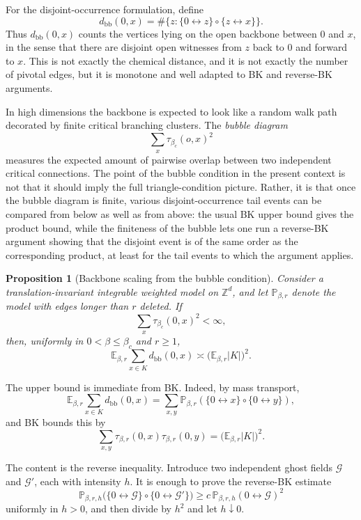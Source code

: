 \documentclass[11pt,reqno]{book}
\numberwithin{equation}{chapter}
\theoremstyle{plain}
\newtheorem{prop}[theorem]{Proposition}
\theoremstyle{definition}
\theoremstyle{remark}
\renewcommand{\P}{\mathbb P}
\newcommand{\E}{\mathbb E}
\newcommand{\1}{\mathbf 1}
\begin{document}
For the disjoint-occurrence formulation, define
\[
  d_{\mathrm{bb}}(0,x)
  =
  \#\{z:\{0\leftrightarrow z\}\circ\{z\leftrightarrow x\}\}.
\]
Thus \(d_{\mathrm{bb}}(0,x)\) counts the vertices lying on the open backbone
between \(0\) and \(x\), in the sense that there are disjoint open witnesses
from \(z\) back to \(0\) and forward to \(x\). This is not exactly the
chemical distance, and it is not exactly the number of pivotal edges, but it
is monotone and well adapted to BK and reverse-BK arguments.

In high dimensions the backbone is expected to look like a random walk path decorated by finite critical branching clusters. The \emph{bubble diagram}
\[
  \sum_x \tau_{\beta_c}(o,x)^2
\]
measures the expected amount of pairwise overlap between two independent critical connections. The point of the bubble condition in the present context is not that it should imply the full triangle-condition picture. Rather, it is that once the bubble diagram is finite, various disjoint-occurrence tail events can be compared from below as well as from above: the usual BK upper bound gives the product bound, while the finiteness of the bubble lets one run a reverse-BK argument showing that the disjoint event is of the same order as the corresponding product, at least for the tail events to which the argument applies.

\begin{prop}[Backbone scaling from the bubble condition]
Consider a translation-invariant integrable weighted model on \(\mathbb Z^d\),
and let \(\P_{\beta,r}\) denote the model with edges longer than \(r\)
deleted. If
\[
  \sum_x \tau_{\beta_c}(0,x)^2<\infty,
\]
then, uniformly in \(0<\beta\leq\beta_c\) and \(r\geq1\),
\[
  \E_{\beta,r}\sum_{x\in K} d_{\mathrm{bb}}(0,x)
  \asymp
  \bigl(\E_{\beta,r}|K|\bigr)^2 .
\]
\end{prop}

The upper bound is immediate from BK. Indeed, by mass transport,
\[
  \E_{\beta,r}\sum_{x\in K}d_{\mathrm{bb}}(0,x)
  =
  \sum_{x,y}
  \P_{\beta,r}(\{0\leftrightarrow x\}\circ\{0\leftrightarrow y\}),
\]
and BK bounds this by
\[
  \sum_{x,y}\tau_{\beta,r}(0,x)\tau_{\beta,r}(0,y)
  =
  \bigl(\E_{\beta,r}|K|\bigr)^2.
\]

The content is the reverse inequality. Introduce two independent ghost fields
\(\mathcal G\) and \(\mathcal G'\), each with intensity \(h\). It is enough
to prove the reverse-BK estimate
\[
  \P_{\beta,r,h}
  \bigl(\{0\leftrightarrow\mathcal G\}
  \circ
  \{0\leftrightarrow\mathcal G'\}\bigr)
  \geq
  c\,\P_{\beta,r,h}(0\leftrightarrow\mathcal G)^2
\]
uniformly in \(h>0\), and then divide by \(h^2\) and let \(h\downarrow0\).
\end{document}
